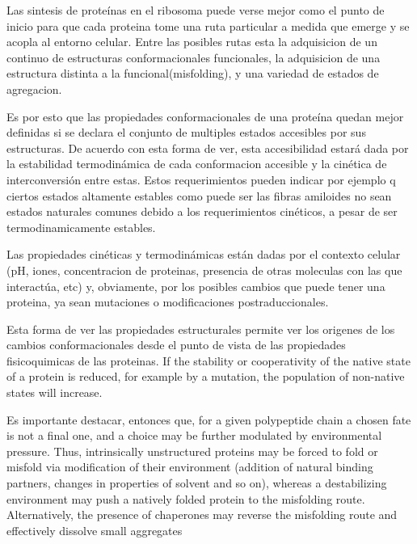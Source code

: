 Las sintesis de proteínas en el ribosoma puede verse mejor como el punto de inicio para que cada proteina tome una ruta particular a medida que emerge y se acopla al entorno celular. 
Entre las posibles rutas esta la adquisicion de un continuo de estructuras conformacionales funcionales, la adquisicion de una estructura distinta a la funcional(misfolding), y una variedad de estados de agregacion.


Es por esto que las propiedades conformacionales de una proteína quedan mejor definidas si se declara el conjunto de multiples estados accesibles por sus estructuras.
De acuerdo con esta forma de ver, esta accesibilidad estará dada por la estabilidad termodinámica de cada conformacion accesible y la cinética de interconversión entre estas.
Estos requerimientos pueden indicar por ejemplo q ciertos estados altamente estables como puede ser las fibras amiloides no sean estados naturales comunes debido a los requerimientos cinéticos, a pesar de ser termodinamicamente estables.

Las propiedades cinéticas y termodinámicas están dadas por el contexto celular (pH, iones, concentracion de proteinas, presencia de otras moleculas con las que interactúa, etc) y, obviamente, por los posibles cambios que puede tener una proteina,
ya sean mutaciones o modificaciones postraduccionales.

Esta forma de ver las propiedades estructurales permite ver los origenes de los cambios conformacionales desde el punto de vista de las propiedades fisicoquimicas de las proteinas.
If the stability or cooperativity of the native state of a protein is reduced, for example by a mutation, the population of non-native states will increase.


Es importante destacar, entonces que, for a given polypeptide chain a chosen fate is not a final one, and a choice may be further modulated by environmental pressure. 
Thus, intrinsically unstructured proteins may be forced to fold or misfold via modification of their environment (addition of natural binding partners, changes in properties of solvent and so on), 
whereas a destabilizing environment may push a natively folded protein to the misfolding route. Alternatively, the presence of chaperones may reverse the misfolding route and effectively dissolve small aggregates


